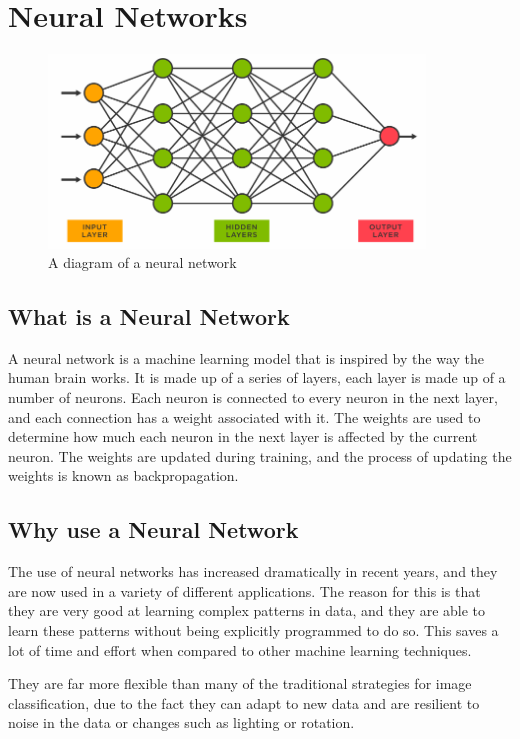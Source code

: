 \documentclass[]{final_report}
\begin{document}
\chapter{Neural Networks}
\begin{figure}[ht!]
  \centering
  \includegraphics[width=100mm]{images/NeuralNetwork.png}
  \caption{A diagram of a neural network \cite{NeuralNetworkDiagram}}
\end{figure}

\section{What is a Neural Network}
A neural network is a machine learning model that is inspired by the way the human brain works.
It is made up of a series of layers, each layer is made up of a number of neurons.
Each neuron is connected to every neuron in the next layer, and each connection has a weight associated with it.
The weights are used to determine how much each neuron in the next layer is affected by the current neuron.
The weights are updated during training, and the process of updating the weights is known as backpropagation.

\section{Why use a Neural Network}
The use of neural networks has increased dramatically in recent years, and they are now used in a variety of different applications.
The reason for this is that they are very good at learning complex patterns in data, and they are able to learn 
these patterns without being explicitly programmed to do so. This saves a lot of time and effort when compared to other machine learning techniques.

They are far more flexible than many of the traditional strategies for image classification, due to the fact they can adapt to new data and are
resilient to noise in the data or changes such as lighting or rotation.
\end{document}
